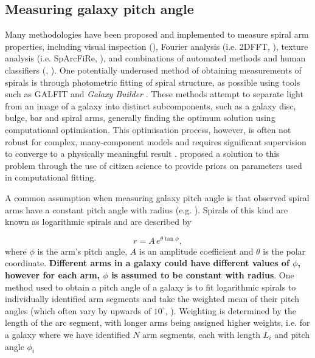 \label{section:method}

\subsection{Measuring galaxy pitch angle}
Many methodologies have been proposed and implemented to measure spiral arm properties, including visual inspection (\citealt{2015A&A...582A..86H}), Fourier analysis (i.e. \textsc{2DFFT}, \citealt{2012ApJS..199...33D}), texture analysis (i.e. SpArcFiRe, \citealt{2014ApJ...790...87D}), and combinations of automated methods and human classifiers (\citealt{2017MNRAS.472.2263H}, \citealt{2020MNRAS.493.3854H}). One potentially underused method of obtaining measurements of spirals is through photometric fitting of spiral structure, as possible using tools such as \textsc{GALFIT} \citep{2010AJ....139.2097P} and \textit{Galaxy Builder} \citep{2020arXiv200610450L}. These methods attempt to separate light from an image of a galaxy into distinct subcomponents, such as a galaxy disc, bulge, bar and spiral arms, generally finding the optimum solution using computational optimisation. This optimisation process, however, is often not robust for complex, many-component models and requires significant supervision to converge to a physically meaningful result \citep{Gao2017:1709.00746v1}. \citet{2020arXiv200610450L} proposed a solution to this problem through the use of citizen science to provide priors on parameters used in computational fitting.

A common assumption when measuring galaxy pitch angle is that observed spiral arms have a constant pitch angle with radius (e.g. \citealt{2012ApJS..199...33D,2013MNRAS.436.1074S,2014ApJ...790...87D}). Spirals of this kind are known as logarithmic spirals and are described by

\begin{equation}
  \label{eq:log-spiral}
r = A\,e^{\theta\tan\phi},
\end{equation}
%
where $\phi$ is the arm's pitch angle, $A$ is an amplitude coefficient and $\theta$ is the polar coordinate. \textbf{Different arms in a galaxy could have different values of $\phi$, however for each arm, $\phi$ is assumed to be constant with radius}. One method used to obtain a pitch angle of a galaxy is to fit logarithmic spirals to individually identified arm segments and take the weighted mean of their pitch angles (which often vary by upwards of $10^\circ$, \citealt{2014ApJ...790...87D}). Weighting is determined by the length of the arc segment, with longer arms being assigned higher weights, i.e. for a galaxy where we have identified $N$ arm segments, each with length $L_i$ and pitch angle $\phi_i$

